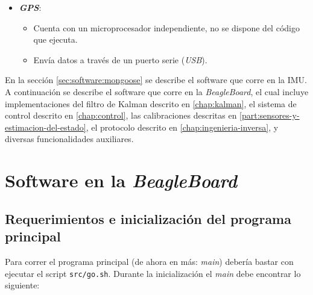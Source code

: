 \documentclass[main]{subfiles}
\begin{document}
\begin{itemize}
  \begin{itemize}
  \item Se programa en \textit{Arduino}, un lenguaje muy similar a \verb+C+, con algunas simplificaciones.
  \item Lee datos de los sensores y se comunica mediante un puerto serie.
  \item El c\'odigo est\'a fuertemente basado en el que ven\'ia con la IMU, fue modificado para adecuarlo a las necesidades del proyecto.
  \end{itemize}
\item \textbf{\textit{GPS}}:
  \begin{itemize}
  \item Cuenta con un microprocesador independiente, no se dispone del c\'odigo que ejecuta.
  \item Env\'ia datos a trav\'es de un puerto serie (\textit{USB}).
  \end{itemize}
\end{itemize}

En la secci\'on \ref{sec:software:mongoose} se describe el software que corre en la IMU. A continuaci\'on se describe el software que corre en la \textit{BeagleBoard}, el cual incluye implementaciones del filtro de Kalman descrito en \ref{chap:kalman}, el sistema de control descrito en \ref{chap:control}, las calibraciones descritas en \ref{part:sensores-y-estimacion-del-estado}, el protocolo descrito en \ref{chap:ingenieria-inversa}, y diversas funcionalidades auxiliares.

\section{Software en la \textit{BeagleBoard}}

\subsection{Requerimientos e inicializaci\'on del programa principal}
\label{sec:software-init}

Para correr el programa principal (de ahora en más: \textit{main}) deber\'ia bastar con ejecutar el script \verb+src/go.sh+. Durante la inicializaci\'on el \textit{main} debe encontrar lo siguiente:\newline
\vspace{-20pt}
\end{document}
